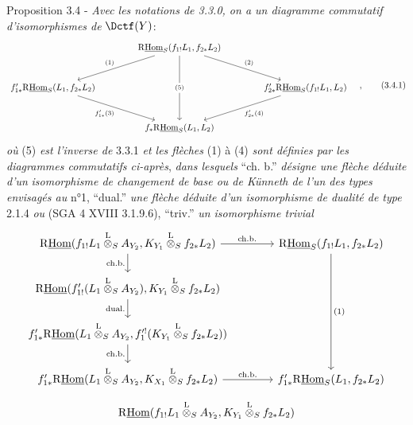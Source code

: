\begin{statement}{Proposition 3.4 -}
\emph{Avec les notations de 3.3.0, on a un diagramme commutatif d'isomorphismes de} $\Dctf(Y)$:
\begin{equation}
\begin{tikzcd}[column sep=4.0em,row sep=2.8em]
& \mathrm{R}\underline{\mathrm{Hom}}_S(f_{1!}L_1,f_{2*}L_2)
  \arrow[dl,"(1)"'] \arrow[dr,"(2)"] \arrow[dd,"(5)" description] & \\
f'_{1*}\mathrm{R}\underline{\mathrm{Hom}}_S(L_1,f_{2*}L_2) \arrow[dr,"f'_{1*}(3)"'] &&
f'_{2*}\mathrm{R}\underline{\mathrm{Hom}}_S(f_{1!}L_1,L_2) \arrow[dl,"f'_{2*}(4)"] \\
& f_*\mathrm{R}\underline{\mathrm{Hom}}_S(L_1,L_2) &
\end{tikzcd}\quad ,
\tag{3.4.1}
\end{equation}
\emph{où} (5) \emph{est l'inverse de} 3.3.1 \emph{et les flèches} (1) à (4) \emph{sont définies par les diagrammes commutatifs ci-après}, \emph{dans lesquels} ``ch. b.'' \emph{désigne une flèche déduite} 
\emph{d'un}
\emph{isomorphisme de changement de base ou de Künneth de l'un des types envisagés au} n°1, ``dual.'' \emph{une flèche déduite d'un isomorphisme de dualité de type} 2.1.4 \emph{ou} (SGA 4 XVIII 3.1.9.6), ``triv.'' \emph{un isomorphisme trivial}
\[
\begin{tikzcd}[column sep=3.7em,row sep=1.7em]
\mathrm{R}\underline{\mathrm{Hom}}(f_{1!}L_1\overset{\mathrm{L}}{\otimes}_S A_{Y_2},K_{Y_1}\overset{\mathrm{L}}{\otimes}_S f_{2*}L_2)
  \arrow[r,"\mathrm{ch.b.}"] \arrow[d,"\mathrm{ch.b.}"']
& \mathrm{R}\underline{\mathrm{Hom}}_S(f_{1!}L_1,f_{2*}L_2) \arrow[ddd,"(1)"] \\
\mathrm{R}\underline{\mathrm{Hom}}(f'_{1!}(L_1\overset{\mathrm{L}}{\otimes}_S A_{Y_2}),K_{Y_1}\overset{\mathrm{L}}{\otimes}_S f_{2*}L_2) \arrow[d,"\mathrm{dual.}"']
& \\
f'_{1*}\mathrm{R}\underline{\mathrm{Hom}}(L_1\overset{\mathrm{L}}{\otimes}_S A_{Y_2},f_1'^!(K_{Y_1}\overset{\mathrm{L}}{\otimes}_S f_{2*}L_2)) \arrow[d,"\mathrm{ch.b.}"']
& \\
f'_{1*}\mathrm{R}\underline{\mathrm{Hom}}(L_1\overset{\mathrm{L}}{\otimes}_S A_{Y_2},K_{X_1}\overset{\mathrm{L}}{\otimes}_S f_{2*}L_2) \arrow[r,"\mathrm{ch.b.}"]
& f'_{1*}\mathrm{R}\underline{\mathrm{Hom}}_S(L_1,f_{2*}L_2)
\end{tikzcd}
\]
\[
\begin{tikzcd}[column sep=3.7em,row sep=1.7em]
\mathrm{R}\underline{\mathrm{Hom}}(f_{1!}L_1\overset{\mathrm{L}}{\otimes}_S A_{Y_2},K_{Y_1}\overset{\mathrm{L}}{\otimes}_S f_{2*}L_2)

\end{tikzcd}\]
\end{statement}
